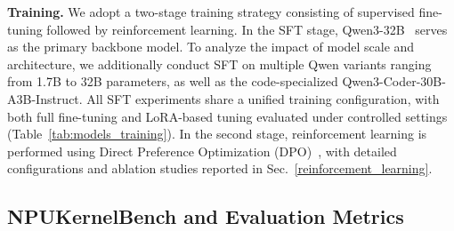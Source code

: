 \textbf{Training.}
We adopt a two-stage training strategy consisting of supervised fine-tuning followed by reinforcement learning. In the SFT stage, Qwen3-32B~\cite{qwen3technicalreport} serves as the primary backbone model. To analyze the impact of model scale and architecture, we additionally conduct SFT on multiple Qwen variants ranging from 1.7B to 32B parameters, as well as the code-specialized Qwen3-Coder-30B-A3B-Instruct. All SFT experiments share a unified training configuration, with both full fine-tuning and LoRA-based tuning evaluated under controlled settings (Table~\ref{tab:models_training}). In the second stage, reinforcement learning is performed using Direct Preference Optimization (DPO)~\cite{RafailovSMMEF23}, with detailed configurations and ablation studies reported in Sec.~\ref{reinforcement_learning}.



\subsection{NPUKernelBench and Evaluation Metrics} %


